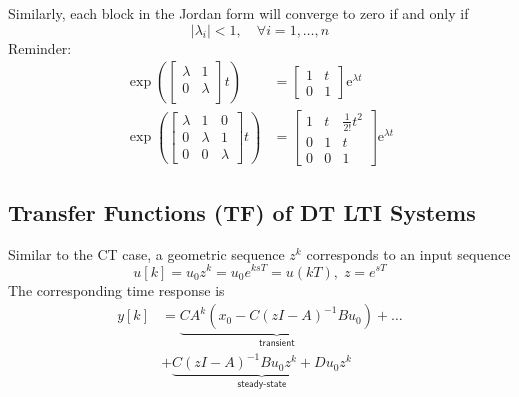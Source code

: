 
Similarly, each block in the Jordan form will converge to zero if and only if
\begin{equation*}
    |\lambda_i| <1,\quad\forall i=1,\ldots,n
\end{equation*}
Reminder:
\begin{align*}
    \left.\exp\left(
    \begin{bmatrix}\lambda & 1       \\
               0       & \lambda \\
        \end{bmatrix}\right.t\right)           & =
    \begin{bmatrix}1 & t \\
               0 & 1
    \end{bmatrix}
    \text{e}^{\lambda t}                       \\
    \left.\exp\left(
    \begin{bmatrix}\lambda & 1       & 0       \\
               0       & \lambda & 1       \\
               0       & 0       & \lambda
        \end{bmatrix}\right.t\right) & =
    \begin{bmatrix}1 & t & \frac{1}{2!}t^2 \\
               0 & 1 & t               \\
               0 & 0 & 1
    \end{bmatrix}
    \text{e}^{\lambda t}
\end{align*}

\subsection{Transfer Functions (TF) of DT LTI Systems}

Similar to the CT case, a geometric sequence $z^k$ corresponds to an input sequence
\begin{equation*}
    u[k] =u_0z^k=u_0e^{ksT}=u(kT), \; z=e^{sT}
\end{equation*}
The corresponding time response is
\begin{align*}
    y[k] & = \underbrace{CA^k(x_0-C{(zI-A)}^{-1}Bu_0)}_{\textsf{transient}}+\dots \\
         & +\underbrace{C{(zI-A)}^{-1}Bu_0z^k+Du_0z^k}_{\textsf{steady-state}}
\end{align*}

